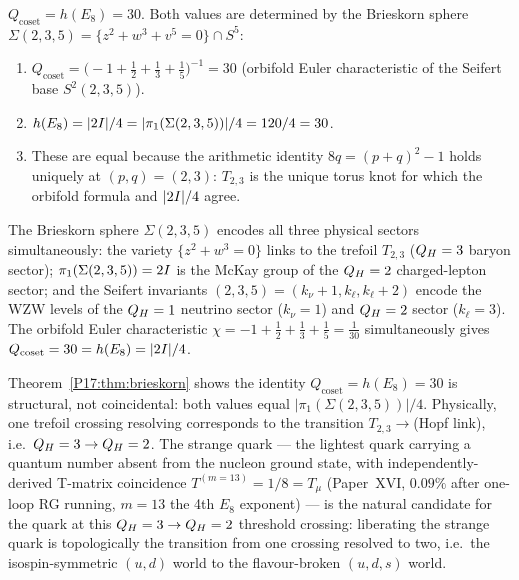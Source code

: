 \begin{theorem}[$Q_{\mathrm{coset}}=h(E_8)$: Brieskorn sphere as common source]
\label{P17:thm:brieskorn}
$Q_{\mathrm{coset}}=h(E_8)=30$. Both values are determined by the
Brieskorn sphere $\Sigma(2,3,5)=\{z^2+w^3+v^5=0\}\cap S^5$:
\begin{enumerate}
\item[\emph{(i)}] $Q_{\mathrm{coset}}=\bigl(-1+\tfrac12+\tfrac13+\tfrac15\bigr)^{-1}=30$
  (orbifold Euler characteristic of the Seifert base $S^2(2,3,5)$).
\item[\emph{(ii)}] $h(E_8)=|2I|/4=|\pi_1(\Sigma(2,3,5))|/4=120/4=30$.
\item[\emph{(iii)}] These are equal because the arithmetic identity $8q=(p+q)^2-1$
  holds uniquely at $(p,q)=(2,3)$: $T_{2,3}$ is the unique torus knot
  for which the orbifold formula and $|2I|/4$ agree.
\end{enumerate}
\end{theorem}

\begin{remark}
\label{P17:rem:brieskorn_sectors}
The Brieskorn sphere $\Sigma(2,3,5)$ encodes all three physical sectors
simultaneously: the variety $\{z^2+w^3=0\}$ links to the trefoil
$T_{2,3}$ ($Q_H=3$ baryon sector); $\pi_1(\Sigma(2,3,5))=2I$ is the
McKay group of the $Q_H=2$ charged-lepton sector; and the Seifert
invariants $(2,3,5)=(k_\nu{+}1,k_\ell,k_\ell{+}2)$ encode the WZW
levels of the $Q_H=1$ neutrino sector ($k_\nu=1$) and $Q_H=2$ sector
($k_\ell=3$). The orbifold Euler characteristic
$\chi=-1+\tfrac12+\tfrac13+\tfrac15=\tfrac1{30}$ simultaneously gives
$Q_{\mathrm{coset}}=30=h(E_8)=|2I|/4$.
\end{remark}

\begin{remark}[$Q_{\mathrm{coset}}=h(E_8)$ and the strange quark]
\label{P17:rem:strange_quark}
Theorem~\ref{P17:thm:brieskorn} shows the identity $Q_{\mathrm{coset}}=h(E_8)=30$
is structural, not coincidental: both values equal $|\pi_1(\Sigma(2,3,5))|/4$.
Physically, one trefoil crossing resolving corresponds to the transition
$T_{2,3}\to$(Hopf link), i.e.\ $Q_H=3\to Q_H=2$. The strange quark ---
the lightest quark carrying a quantum number absent from the nucleon
ground state, with independently-derived T-matrix coincidence
$T^{(m=13)}=1/8=T_\mu$ (Paper~XVI, $0.09\%$ after one-loop RG running,
$m=13$ the 4th $E_8$ exponent) --- is the natural candidate for the
quark at this $Q_H=3\to Q_H=2$ threshold crossing: liberating the
strange quark is topologically the transition from one crossing
resolved to two, i.e.\ the isospin-symmetric $(u,d)$ world to the
flavour-broken $(u,d,s)$ world.
\end{remark}

